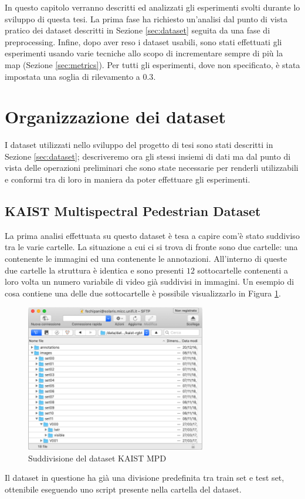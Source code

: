 \label{chap:experiment}
In questo capitolo verranno descritti ed analizzati gli esperimenti svolti durante lo sviluppo di questa tesi. La prima fase ha richiesto un'analisi dal punto di vista pratico dei dataset descritti in Sezione \ref{sec:dataset} seguita da una fase di preprocessing. 
Infine, dopo aver reso i dataset usabili, sono stati effettuati gli esperimenti usando varie tecniche allo scopo di incrementare sempre di più la \acl{map} (Sezione \ref{sec:metrics}). Per tutti gli esperimenti, dove non specificato, è stata impostata una soglia di rilevamento a $0.3$.
\section{Organizzazione dei dataset}
\label{sec:dataset_org}
I dataset utilizzati nello sviluppo del progetto di tesi sono stati descritti in Sezione \ref{sec:dataset}; descriveremo ora gli stessi insiemi di dati ma dal punto di vista delle operazioni preliminari che sono state necessarie per renderli utilizzabili e conformi tra di loro in maniera da poter effettuare gli esperimenti. 
\subsection{KAIST Multispectral Pedestrian Dataset}
\label{subsec:kaist_experiment}
La prima analisi effettuata su questo dataset è tesa a capire com'è stato suddiviso tra le varie cartelle. La situazione a cui ci si trova di fronte sono due cartelle: una contenente le immagini ed una contenente le annotazioni. All'interno di queste due cartelle la struttura è identica e sono presenti $12$ sottocartelle contenenti a loro volta un numero variabile di video già suddivisi in immagini. Un esempio di cosa contiene una delle due sottocartelle è possibile visualizzarlo in Figura \ref{fig:kaist_dataset_folder}.
\begin{figure}
    \centering
    \includegraphics[width=0.7\textwidth]{images/screen_kaist.png}
    \caption{Suddivisione del dataset KAIST MPD}
    \label{fig:kaist_dataset_folder}
\end{figure} 
Il dataset in questione ha già una divisione predefinita tra train set e test set, ottenibile eseguendo uno script presente nella cartella del dataset. 

